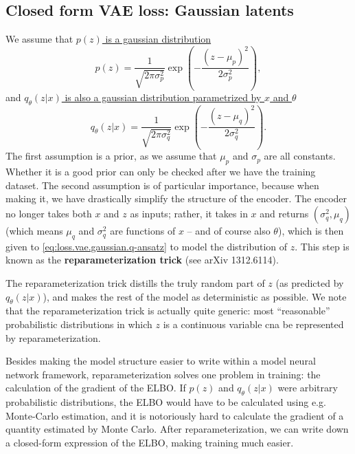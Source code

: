 \documentclass[hyperref, a4paper, 12pt]{report}
\newcommand*{\concept}[1]{{\textbf{#1}}}
\begin{document}
\subsection{Closed form VAE loss: Gaussian latents}

We assume that \uline{$p(z)$ is a gaussian distribution}
\begin{equation}
    p(z) = \frac{1}{\sqrt{2\pi \sigma_p^2}} \exp(- \frac{(z - \mu_p)^2}{2 \sigma_p^2}),
    \label{eq:loss.vae.gaussian.z-prior}
\end{equation} 
and \uline{$q_\theta(z | x)$ is also a gaussian distribution parametrized by $x$ and $\theta$}
\begin{equation}
    q_\theta(z | x) = \frac{1}{\sqrt{2\pi \sigma_q^2}} \exp(- \frac{(z - \mu_q)^2}{2 \sigma_q^2}).
    \label{eq:loss.vae.gaussian.q-ansatz}
\end{equation}
The first assumption is a prior, as we assume that $\mu_p$ and $\sigma_p$ are all constants.
Whether it is a good prior can only be checked after we have the training dataset.
The second assumption is of particular importance,
because when making it, we have drastically simplify the structure of the encoder.
The encoder no longer takes both $x$ and $z$ as inputs;
rather, it takes in $x$ and returns $(\sigma_q^2, \mu_q)$
(which means $\mu_q$ and $\sigma_q^2$ are functions of $x$ -- and of course also $\theta$),
which is then given to \eqref{eq:loss.vae.gaussian.q-ansatz} to model the distribution of $z$.
This step is known as the \concept{reparameterization trick} (see arXiv 1312.6114).

The reparameterization trick distills the truly random part of $z$ (as predicted by $q_\theta(z|x)$),
and makes the rest of the model as deterministic as possible.
We note that the reparameterization trick is actually quite generic:
most ``reasonable'' probabilistic distributions in which $z$ is a continuous variable
cna be represented by reparameterization.

Besides making the model structure easier to write within a model neural network framework,
reparameterization solves one problem in training:
the calculation of the gradient of the ELBO.
If $p(z)$ and $q_\theta(z|x)$ were arbitrary probabilistic distributions,
the ELBO would have to be calculated using e.g. Monte-Carlo estimation,
and it is notoriously hard to calculate the gradient of a quantity estimated by Monte Carlo.
After reparameterization, we can write down a closed-form expression of the ELBO,
making training much easier.
\end{document}
